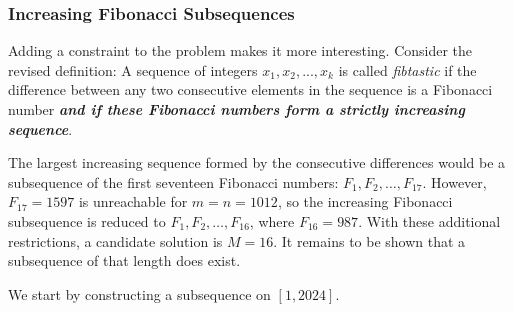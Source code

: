 \subsubsection*{Increasing Fibonacci Subsequences}
Adding a constraint to the problem makes it more interesting. Consider the revised definition:
A sequence of integers $x_{1},x_{2},...,x_{k}$ is called \textit{fibtastic} if the difference between any two consecutive elements in the sequence is a Fibonacci number \textbf{\textit{and if these Fibonacci numbers form a strictly increasing sequence}}.

The largest increasing sequence formed by the consecutive differences would be a subsequence of the first seventeen Fibonacci numbers: $F_{1},F_{2},\ldots,F_{17}$. However, $F_{17}=1597$ is unreachable for $m=n=1012$, so the increasing Fibonacci subsequence is reduced to $F_{1},F_{2},\ldots,F_{16}$, where $F_{16}=987$. With these additional restrictions, a candidate solution is $M=16$. It remains to be shown that a subsequence of that length does exist. 

We start by constructing a subsequence on $[1,2024]$. 

